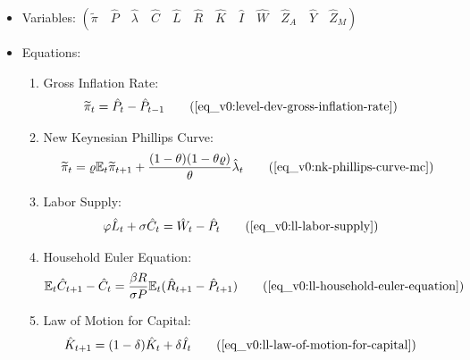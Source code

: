\documentclass[
thesis.tex
]{subfiles}
\begin{document}
	{\singlespacing
		
		\begin{itemize}
			
			\item Variables: \( \left( \tilde{\pi} \quad \hat{P} \quad \hat{\lambda} \quad \hat{C} \quad \hat{L} \quad \hat{R} \quad \hat{K} \quad \hat{I} \quad \hat{W} \quad \hat{Z}_A \quad \hat{Y} \quad \hat{Z}_M \right) \)
			
			\item Equations:
			
			\begin{enumerate}
				
				\item Gross Inflation Rate:
				\begin{align}
					\widetilde{\pi}_t &= \hat{P}_t - \hat{P}_{t-1}
					\tag{\ref{eq_v0:level-dev-gross-inflation-rate}}
				\end{align}
				
				\item New Keynesian Phillips Curve:
				\begin{align}
					\widetilde{\pi}_t = \varrho \E \widetilde{\pi}_{t+1} + \frac{(1-\theta) (1- \theta \varrho)}{\theta} \hat{\lambda}_t
					\tag{\ref{eq_v0:nk-phillips-curve-mc}}
				\end{align}
				
				\item Labor Supply:
				\begin{align}
					\varphi \hat{L}_t + \sigma \hat{C}_t &= \hat{W}_t - \hat{P}_t
					\tag{\ref{eq_v0:ll-labor-supply}}
				\end{align}
				
				\item Household Euler Equation:
				\begin{align}
					\E \hat{C}_{t+1} - \hat{C}_t &= \frac{\beta R}{\sigma P} \E(\hat{R}_{t+1} - \hat{P}_{t+1})
					\tag{\ref{eq_v0:ll-household-euler-equation}}
				\end{align}
				
				\item Law of Motion for Capital:
				\begin{align}
					\hat{K}_{t+1} &= (1-\delta)\hat{K}_t + \delta \hat{I}_t
					\tag{\ref{eq_v0:ll-law-of-motion-for-capital}}
				\end{align}
				
				

\end{enumerate}
\end{itemize}}
\end{document}
